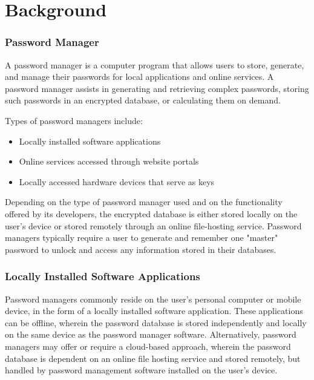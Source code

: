 \chapter{Background}
\label{sec:background}

\subsection{Password Manager}

A password manager is a computer program that allows users to store, generate, and manage their passwords for local applications and online services.
A password manager assists in generating and retrieving complex passwords, storing such passwords in an encrypted database, or calculating them on demand.

Types of password managers include:

\begin{itemize}
    \item Locally installed software applications
    \item Online services accessed through website portals
    \item Locally accessed hardware devices that serve as keys
\end{itemize}

Depending on the type of password manager used and on the functionality offered by its developers, the encrypted database is either stored locally on the user's device or stored remotely through an online file-hosting service. Password managers typically require a user to generate and remember one "master" password to unlock and access any information stored in their databases.

\subsection{Locally Installed Software Applications}

Password managers commonly reside on the user's personal computer or mobile device, in the form of a locally installed software application. These applications can be offline, wherein the password database is stored independently and locally on the same device as the password manager software. Alternatively, password managers may offer or require a cloud-based approach, wherein the password database is dependent on an online file hosting service and stored remotely, but handled by password management software installed on the user's device.

